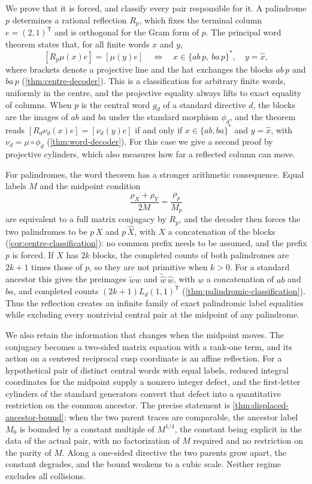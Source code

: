 We prove that it is forced, and classify every pair responsible for it.
A palindrome $p$ determines a rational reflection $R_p$, which fixes the
terminal column $e=(2,1)^{\mathsf T}$ and is orthogonal for the Gram form
of $p$. The principal word theorem states that, for all finite words $x$
and $y$,
$$
 [R_p\mu(x)e]=[\mu(y)e]
 \quad\Longleftrightarrow\quad
 x\in\{ab\,p,\ ba\,p\}^*,\quad y=\widehat x,
$$
where brackets denote a projective line and the hat exchanges the
blocks $ab\,p$ and $ba\,p$ (\cref{thm:centre-decoder}). This is a
classification for arbitrary finite words, uniformly in the centre, and
the projective equality always lifts to exact equality of columns. When
$p$ is the central word $g_d$ of a standard directive $d$, the blocks are
the images of $ab$ and $ba$ under the standard morphism $\phi_d$, and the
theorem reads $[R_d\nu_d(x)e]=[\nu_d(y)e]$ if and only if
$x\in\{ab,ba\}^*$ and $y=\widehat x$, with $\nu_d=\mu\circ\phi_d$
(\cref{thm:word-decoder}). For this case we give a second proof by
projective cylinders, which also measures how far a reflected column can
move.

For palindromes, the word theorem has a stronger arithmetic consequence.
Equal labels $M$ and the midpoint condition
$$
 \frac{\rho_X+\rho_Y}{2M}=\frac{\rho_p}{M_p}
$$
are equivalent to a full matrix conjugacy by $R_p$, and the decoder then
forces the two palindromes to be $p\,X$ and $p\,\widehat X$, with $X$ a
concatenation of the blocks (\cref{cor:centre-classification}): no common
prefix needs to be assumed, and the prefix $p$ is forced. If $X$ has $2k$
blocks, the completed counts of both palindromes are $2k+1$ times those of
$p$, so they are not primitive when $k>0$. For a standard ancestor this
gives the preimages $\widetilde w w$ and $\widetilde{\widehat w}\,\widehat w$,
with $w$ a concatenation of $ab$ and $ba$, and completed counts
$(2k+1)L_d(1,1)^{\mathsf T}$ (\cref{thm:palindromic-classification}).
Thus the reflection creates an infinite family of exact palindromic
label equalities while excluding every nontrivial central pair at the
midpoint of any palindrome.

We also retain the information that changes when the midpoint moves. The
conjugacy becomes a two-sided matrix equation with a rank-one term, and
its action on a centered reciprocal cusp coordinate is an affine
reflection. For a hypothetical pair of distinct central words with equal
labels, reduced integral coordinates for the midpoint supply a nonzero
integer defect, and the first-letter cylinders of the standard generators
convert that defect into a quantitative restriction on the common
ancestor. The precise statement is \cref{thm:displaced-ancestor-bound}:
when the two parent traces are comparable, the ancestor label $M_0$ is
bounded by a constant multiple of $M^{1/4}$, the constant being explicit
in the data of the actual pair, with no factorization of $M$ required and
no restriction on the parity of $M$. Along a one-sided directive the two
parents grow apart, the constant degrades, and the bound weakens to a
cubic scale. Neither regime excludes all collisions.


